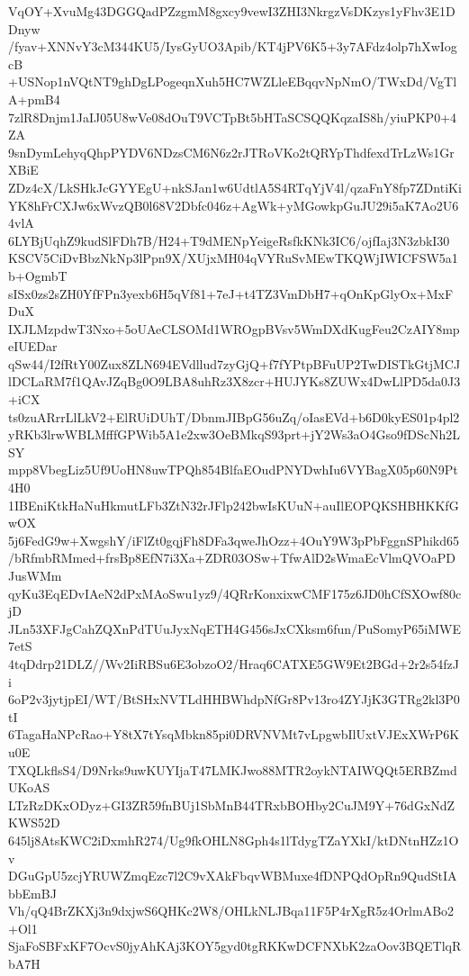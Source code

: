 VqOY+XvuMg43DGGQadPZzgmM8gxcy9vewI3ZHI3NkrgzVsDKzys1yFhv3E1DDnyw
/fyav+XNNvY3cM344KU5/IysGyUO3Apib/KT4jPV6K5+3y7AFdz4olp7hXwIogcB
+USNop1nVQtNT9ghDgLPogeqnXuh5HC7WZLleEBqqvNpNmO/TWxDd/VgTlA+pmB4
7zlR8Dnjm1JaIJ05U8wVe08dOuT9VCTpBt5bHTaSCSQQKqzaIS8h/yiuPKP0+4ZA
9snDymLehyqQhpPYDV6NDzsCM6N6z2rJTRoVKo2tQRYpThdfexdTrLzWs1GrXBiE
ZDz4cX/LkSHkJcGYYEgU+nkSJan1w6UdtlA5S4RTqYjV4l/qzaFnY8fp7ZDntiKi
YK8hFrCXJw6xWvzQB0l68V2Dbfc046z+AgWk+yMGowkpGuJU29i5aK7Ao2U64vlA
6LYBjUqhZ9kudSlFDh7B/H24+T9dMENpYeigeRsfkKNk3IC6/ojfIaj3N3zbkI30
KSCV5CiDvBbzNkNp3lPpn9X/XUjxMH04qVYRuSvMEwTKQWjIWICFSW5a1b+OgmbT
sISx0zs2sZH0YfFPn3yexb6H5qVf81+7eJ+t4TZ3VmDbH7+qOnKpGlyOx+MxFDuX
IXJLMzpdwT3Nxo+5oUAeCLSOMd1WROgpBVsv5WmDXdKugFeu2CzAIY8mpeIUEDar
qSw44/I2fRtY00Zux8ZLN694EVdllud7zyGjQ+f7fYPtpBFuUP2TwDISTkGtjMCJ
lDCLaRM7f1QAvJZqBg0O9LBA8uhRz3X8zcr+HUJYKs8ZUWx4DwLlPD5da0J3+iCX
ts0zuARrrLlLkV2+ElRUiDUhT/DbnmJIBpG56uZq/oIasEVd+b6D0kyES01p4pl2
yRKb3lrwWBLMfffGPWib5A1e2xw3OeBMkqS93prt+jY2Ws3aO4Gso9fDScNh2LSY
mpp8VbegLiz5Uf9UoHN8uwTPQh854BlfaEOudPNYDwhIu6VYBagX05p60N9Pt4H0
1IBEniKtkHaNuHkmutLFb3ZtN32rJFlp242bwIsKUuN+auIlEOPQKSHBHKKfGwOX
5j6FedG9w+XwgshY/iFlZt0gqjFh8DFa3qweJhOzz+4OuY9W3pPbFggnSPhikd65
/bRfmbRMmed+frsBp8EfN7i3Xa+ZDR03OSw+TfwAlD2sWmaEcVlmQVOaPDJusWMm
qyKu3EqEDvIAeN2dPxMAoSwu1yz9/4QRrKonxixwCMF175z6JD0hCfSXOwf80cjD
JLn53XFJgCahZQXnPdTUuJyxNqETH4G456sJxCXksm6fun/PuSomyP65iMWE7etS
4tqDdrp21DLZ//Wv2IiRBSu6E3obzoO2/Hraq6CATXE5GW9Et2BGd+2r2s54fzJi
6oP2v3jytjpEI/WT/BtSHxNVTLdHHBWhdpNfGr8Pv13ro4ZYJjK3GTRg2kl3P0tI
6TagaHaNPcRao+Y8tX7tYsqMbkn85pi0DRVNVMt7vLpgwbIlUxtVJExXWrP6Ku0E
TXQLkflsS4/D9Nrks9uwKUYIjaT47LMKJwo88MTR2oykNTAIWQQt5ERBZmdUKoAS
LTzRzDKxODyz+GI3ZR59fnBUj1SbMnB44TRxbBOHby2CuJM9Y+76dGxNdZKWS52D
645lj8AtsKWC2iDxmhR274/Ug9fkOHLN8Gph4s1lTdygTZaYXkI/ktDNtnHZz1Ov
DGuGpU5zcjYRUWZmqEzc7l2C9vXAkFbqvWBMuxe4fDNPQdOpRn9QudStIAbbEmBJ
Vh/qQ4BrZKXj3n9dxjwS6QHKc2W8/OHLkNLJBqa11F5P4rXgR5z4OrlmABo2+Ol1
SjaFoSBFxKF7OcvS0jyAhKAj3KOY5gyd0tgRKKwDCFNXbK2zaOov3BQETlqRbA7H

